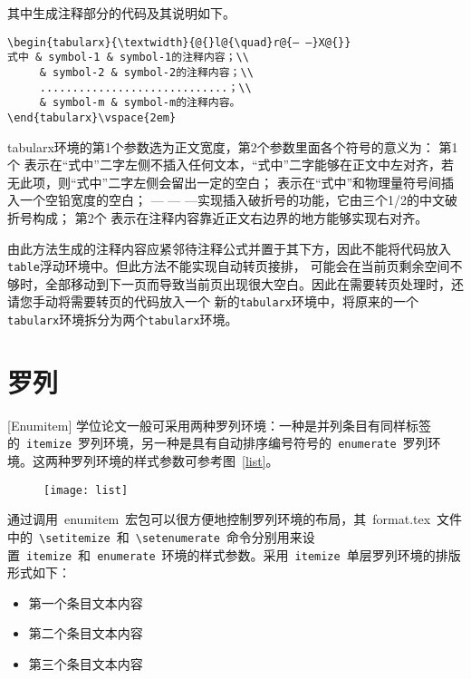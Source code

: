 其中生成注释部分的代码及其说明如下。
\vspace{1em}
\begin{lstlisting}
\begin{tabularx}{\textwidth}{@{}l@{\quad}r@{— —}X@{}}
式中 & symbol-1 & symbol-1的注释内容；\\
     & symbol-2 & symbol-2的注释内容；\\
     .............................；\\
     & symbol-m & symbol-m的注释内容。
\end{tabularx}\vspace{2em}
\end{lstlisting}


tabularx环境的第1个参数选为正文宽度，第2个参数里面各个符号的意义为：
    第1个 \@{}表示在“式中”二字左侧不插入任何文本，“式中”二字能够在正文中左对齐，若无此项，则“式中”二字左侧会留出一定的空白；
    \@{\quad}表示在“式中”和物理量符号间插入一个空铅宽度的空白；
    \@{— — —}实现插入破折号的功能，它由三个1/2的中文破折号构成；
    第2个 \@{}表示在注释内容靠近正文右边界的地方能够实现右对齐。


由此方法生成的注释内容应紧邻待注释公式并置于其下方，因此不能将代码放入\verb|table|浮动环境中。但此方法不能实现自动转页接排，
可能会在当前页剩余空间不够时，全部移动到下一页而导致当前页出现很大空白。因此在需要转页处理时，还请您手动将需要转页的代码放入一个
新的\verb|tabularx|环境中，将原来的一个\verb|tabularx|环境拆分为两个\verb|tabularx|环境。


\section{罗列}[Enumitem]
学位论文一般可采用两种罗列环境：一种是并列条目有同样标签的~\verb|itemize|~罗列环境，另一种是具有自动排序编号符号的~\verb|enumerate|~罗列环境。这两种罗列环境的样式参数可参考图~\ref{list}。
\begin{figure}[htbp]
\centering
\texttt{[image: list]}
\vspace{-1em}
\end{figure}

通过调用~enumitem~宏包可以很方便地控制罗列环境的布局，其~format.tex~文件中的~\verb|\setitemize|~和~\verb|\setenumerate|~命令分别用来设置~\verb|itemize|~和~\verb|enumerate|~环境的样式参数。采用~\verb|itemize|~单层罗列环境的排版形式如下：

\begin{itemize}
\item 第一个条目文本内容
\item 第二个条目文本内容
\item 第三个条目文本内容
\end{itemize}

